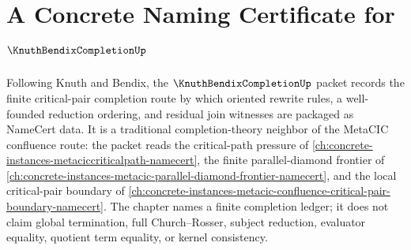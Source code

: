 \chapter{A Concrete Naming Certificate for $\KnuthBendixCompletionUp$}
\label{ch:concrete-instances-knuth-bendix-completion-namecert}

Following Knuth and Bendix, the $\KnuthBendixCompletionUp$ packet records the finite critical-pair completion route by which oriented rewrite rules, a well-founded reduction ordering, and residual join witnesses are packaged as NameCert data. It is a traditional completion-theory neighbor of the MetaCIC confluence route: the packet reads the critical-path pressure of \autoref{ch:concrete-instances-metaciccriticalpath-namecert}, the finite parallel-diamond frontier of \autoref{ch:concrete-instances-metacic-parallel-diamond-frontier-namecert}, and the local critical-pair boundary of \autoref{ch:concrete-instances-metacic-confluence-critical-pair-boundary-namecert}. The chapter names a finite completion ledger; it does not claim global termination, full Church--Rosser, subject reduction, evaluator equality, quotient term equality, or kernel consistency.

